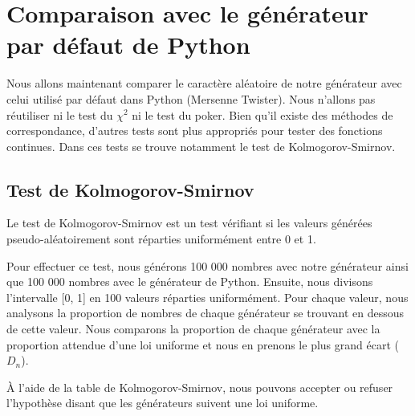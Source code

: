 \documentclass[10pt,a4paper]{article}
\begin{document}
	\newpage
	\section{Comparaison avec le générateur par défaut de Python}
	Nous allons maintenant comparer le caractère aléatoire de notre générateur avec celui utilisé par défaut dans Python (Mersenne Twister).
	Nous n'allons pas réutiliser ni le test du $\chi^2$ ni le test du poker.
	Bien qu'il existe des méthodes de correspondance, d'autres tests sont plus appropriés pour tester des fonctions continues.
	Dans ces tests se trouve notamment le test de Kolmogorov-Smirnov.
	
	\newpage
	\subsection{Test de Kolmogorov-Smirnov}
	Le test de Kolmogorov-Smirnov est un test vérifiant si les valeurs générées pseudo-aléatoirement sont réparties uniformément entre 0 et 1.
	
	Pour effectuer ce test, nous générons 100 000 nombres avec notre générateur ainsi que 100 000 nombres avec le générateur de Python.
	Ensuite, nous divisons l'intervalle [0, 1] en 100 valeurs réparties uniformément.
	Pour chaque valeur, nous analysons la proportion de nombres de chaque générateur se trouvant en dessous de cette valeur.
	Nous comparons la proportion de chaque générateur avec la proportion attendue d'une loi uniforme et nous en prenons le plus grand écart ($D_n$).
	
	À l'aide de la table de Kolmogorov-Smirnov, nous pouvons accepter ou refuser l'hypothèse disant que les générateurs suivent une loi uniforme.
	
\end{document}

